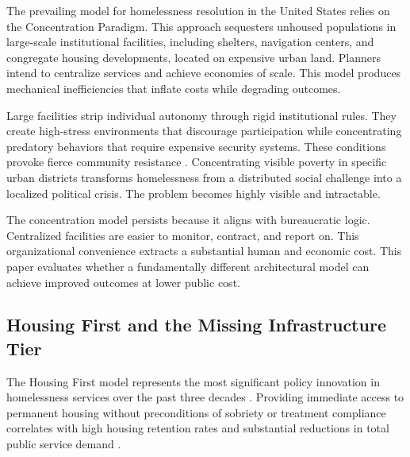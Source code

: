 \documentclass[12pt, letterpaper]{article}
\begin{document}
The prevailing model for homelessness resolution in the United States relies on the Concentration Paradigm. This approach sequesters unhoused populations in large-scale institutional facilities, including shelters, navigation centers, and congregate housing developments, located on expensive urban land. Planners intend to centralize services and achieve economies of scale. This model produces mechanical inefficiencies that inflate costs while degrading outcomes.

Large facilities strip individual autonomy through rigid institutional rules. They create high-stress environments that discourage participation while concentrating predatory behaviors that require expensive security systems. These conditions provoke fierce community resistance \citep{dear_wolch_1987}. Concentrating visible poverty in specific urban districts transforms homelessness from a distributed social challenge into a localized political crisis. The problem becomes highly visible and intractable.

The concentration model persists because it aligns with bureaucratic logic. Centralized facilities are easier to monitor, contract, and report on. This organizational convenience extracts a substantial human and economic cost. This paper evaluates whether a fundamentally different architectural model can achieve improved outcomes at lower public cost.

\subsection{Housing First and the Missing Infrastructure Tier}

The Housing First model represents the most significant policy innovation in homelessness services over the past three decades \citep{tsemberis_2010}. Providing immediate access to permanent housing without preconditions of sobriety or treatment compliance correlates with high housing retention rates and substantial reductions in total public service demand \citep{padgett_henwood_tsemberis_2016}.
\end{document}
